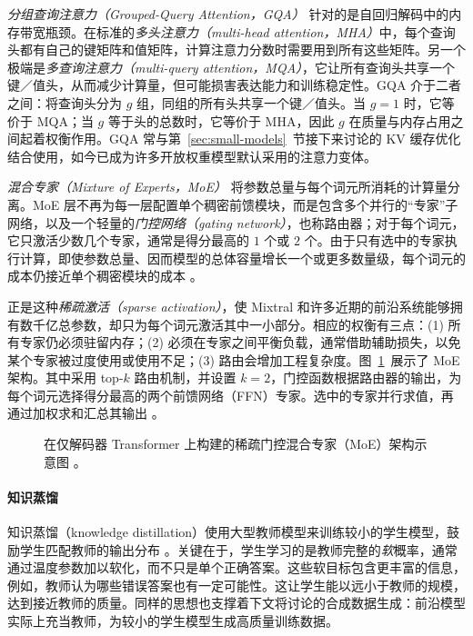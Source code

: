 \textit{分组查询注意力（Grouped-Query Attention，GQA）} \citep{ainslie-etal-2023-gqa} 针对的是自回归解码中的内存带宽瓶颈。在标准的\emph{多头注意力（multi-head attention，MHA）}中，每个查询头都有自己的键矩阵和值矩阵，计算注意力分数时需要用到所有这些矩阵。另一个极端是\emph{多查询注意力（multi-query attention，MQA）}，它让所有查询头共享一个键／值头，从而减少计算量，但可能损害表达能力和训练稳定性。GQA 介于二者之间：将查询头分为 $g$ 组，同组的所有头共享一个键／值头。当 $g = 1$ 时，它等价于 MQA；当 $g$ 等于头的总数时，它等价于 MHA，因此 $g$ 在质量与内存占用之间起着权衡作用。GQA 常与第~\ref{sec:small-models}~节接下来讨论的 KV 缓存优化结合使用，如今已成为许多开放权重模型默认采用的注意力变体。

\textit{混合专家（Mixture of Experts，MoE）} \citep{shazeer2017outrageouslylargeneuralnetworks} 将参数总量与每个词元所消耗的计算量分离。MoE 层不再为每一层配置单个稠密前馈模块，而是包含多个并行的“专家”子网络，以及一个轻量的\emph{门控网络（gating network）}，也称路由器；对于每个词元，它只激活少数几个专家，通常是得分最高的 $1$ 个或 $2$ 个。由于只有选中的专家执行计算，即使参数总量、因而模型的总体容量增长一个或更多数量级，每个词元的成本仍接近单个稠密模块的成本 \citep{JMLR:v23:21-0998}。

正是这种\emph{稀疏激活（sparse activation）}，使 Mixtral 和许多近期的前沿系统能够拥有数千亿总参数，却只为每个词元激活其中一小部分。相应的权衡有三点：(1) 所有专家仍必须驻留内存；(2) 必须在专家之间平衡负载，通常借助辅助损失，以免某个专家被过度使用或使用不足；(3) 路由会增加工程复杂度。图~\ref{fig:moe}~展示了 MoE 架构。其中采用 top-$k$ 路由机制，并设置 $k=2$，门控函数根据路由器的输出，为每个词元选择得分最高的两个前馈网络（FFN）专家。选中的专家并行求值，再通过加权求和汇总其输出 \citep{zhang2025mixtureexpertslargelanguage}。

\begin{figure}[t]
    \centering
    
    \caption{在仅解码器 Transformer 上构建的稀疏门控混合专家（MoE）架构示意图 \citep{zhang2025mixtureexpertslargelanguage}。}
    \label{fig:moe}
\end{figure}

\paragraph{知识蒸馏}
知识蒸馏（knowledge distillation）使用大型教师模型来训练较小的学生模型，鼓励学生匹配教师的输出分布 \citep{gu2023minillm, xu2024survey}。关键在于，学生学习的是教师完整的\emph{软}概率，通常通过温度参数加以软化，而不只是单个正确答案。这些软目标包含更丰富的信息，例如，教师认为哪些错误答案也有一定可能性。这让学生能以远小于教师的规模，达到接近教师的质量。同样的思想也支撑着下文将讨论的合成数据生成：前沿模型实际上充当教师，为较小的学生模型生成高质量训练数据。

